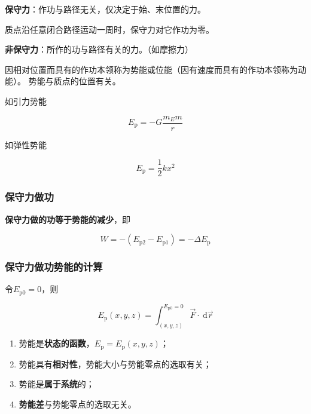 \documentclass[
	12pt, %
	a4paper, %
]{myLegrandOrangeBook}
\begin{document}
    \textbf{保守力}：作功与路径无关，仅决定于始、末位置的力。

    质点沿任意闭合路径运动一周时，保守力对它作功为零。

    \textbf{非保守力}：所作的功与路径有关的力。（如摩擦力）

    \vspace{1em}
    \begin{definition}[势能]

        因相对位置而具有的作功本领称为势能或位能（因有速度而具有的作功本领称为动能）。
        势能与质点的位置有关。

    \end{definition}

    如引力势能

    \[
        E_{\mathrm{p}} = -G \frac{m_{E}m}{r}
    \]

    如弹性势能

    \[
        E_{\mathrm{p}} = \frac{1}{2}kx^2
    \]

    \subsubsection*{保守力做功}

    \textbf{保守力做的功等于势能的减少}，即

    \begin{equation}
        W =-\left(E_{\mathrm{p} 2}-E_{\mathrm{p} 1}\right)=-\Delta E_{\mathrm{p}}
    \end{equation}

    \subsubsection*{保守力做功势能的计算}

    令\(E_{\mathrm{p0}} = 0\)，则

    \begin{equation}
        E_{\mathrm{p}}(x, y, z)=\int_{(x, y, z)}^{E_{\mathrm{p} 0}=0} \overrightarrow{F} \cdot \mathrm{~d} \overrightarrow{r}
    \end{equation}

    \begin{enumerate}
        \item 势能是\textbf{状态的函数}，$E_{\mathrm{p}}=E_{\mathrm{p}}(x, y, z)$；
        \item 势能具有\textbf{相对性}，势能大小与势能零点的选取有关；
        \item 势能是\textbf{属于系统}的；
        \item \textbf{势能差}与势能零点的选取无关。
    \end{enumerate}
\end{document}
